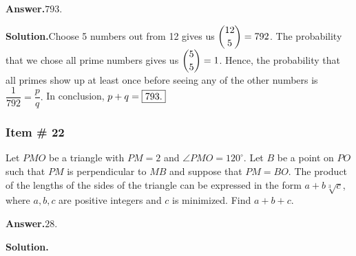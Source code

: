 \documentclass[11pt,paper=letter]{scrartcl}
\newcommand{\ans}[1]{{\sffamily \bfseries Answer.}\;\(\boxed{\text{#1}}\).}
\newcommand{\sol}{{\sffamily \bfseries Solution.}\;}
\begin{document}
\ans{793}

\sol Choose 5 numbers out from 12 gives us $\dbinom{12}{5}=792$. The probability that we chose all prime numbers gives us $\dbinom{5}{5}=1$. Hence, the probability that all primes show up at least once before seeing any of the other numbers is $\dfrac{1}{792} = \dfrac{p}{q}.$ In conclusion, $p+q=\fbox{793.}$
 
\subsubsection{Item \# 22}

\begin{probboxed}
Let $PMO$ be a triangle with $PM =2$ and $\angle PMO = 120^{\circ}$. Let $B$ be a point on $PO$ such that $PM$ is perpendicular to $MB$ and suppose that $PM=BO$. The product of the lengths of the sides of the triangle can be expressed in the form $a + b\sqrt[3]{c}$, where $a,b,c$ are positive integers and $c$ is minimized. Find $a+b+c$.
\end{probboxed}

\ans{28}

\sol
\end{document}
